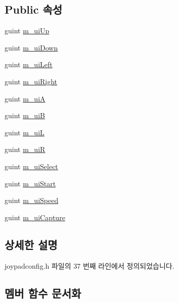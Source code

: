 \subsection*{Public 속성}
\begin{DoxyCompactItemize}
\item 
guint \mbox{\hyperlink{class_v_b_a_1_1_joypad_config_a9cd889f0d74de1737b32e81b21a0f78d}{m\+\_\+ui\+Up}}
\item 
guint \mbox{\hyperlink{class_v_b_a_1_1_joypad_config_a9c414798f77a069295c251e9d8805452}{m\+\_\+ui\+Down}}
\item 
guint \mbox{\hyperlink{class_v_b_a_1_1_joypad_config_af93165db21cb58f3b6df8f315d2471b5}{m\+\_\+ui\+Left}}
\item 
guint \mbox{\hyperlink{class_v_b_a_1_1_joypad_config_abc942773203f5ece2be3e4cb177d543f}{m\+\_\+ui\+Right}}
\item 
guint \mbox{\hyperlink{class_v_b_a_1_1_joypad_config_afd5a199c5dccb3d838f181a620b1fd33}{m\+\_\+uiA}}
\item 
guint \mbox{\hyperlink{class_v_b_a_1_1_joypad_config_a08925fb801c679365dc7209cd68f9039}{m\+\_\+uiB}}
\item 
guint \mbox{\hyperlink{class_v_b_a_1_1_joypad_config_a381cc261054c37379e3e558af75f2ade}{m\+\_\+uiL}}
\item 
guint \mbox{\hyperlink{class_v_b_a_1_1_joypad_config_ae78aa1e4661abe1501ae6d1dbc55db25}{m\+\_\+uiR}}
\item 
guint \mbox{\hyperlink{class_v_b_a_1_1_joypad_config_aed4863e16a6c6690449c953190954cd4}{m\+\_\+ui\+Select}}
\item 
guint \mbox{\hyperlink{class_v_b_a_1_1_joypad_config_a67e697cb5ca51bc15837385ea6fdf2b3}{m\+\_\+ui\+Start}}
\item 
guint \mbox{\hyperlink{class_v_b_a_1_1_joypad_config_acb2ec2357b18f2e259097b8827f37e3e}{m\+\_\+ui\+Speed}}
\item 
guint \mbox{\hyperlink{class_v_b_a_1_1_joypad_config_a2322b0a1550314bab86db0231d260459}{m\+\_\+ui\+Capture}}
\end{DoxyCompactItemize}


\subsection{상세한 설명}


joypadconfig.\+h 파일의 37 번째 라인에서 정의되었습니다.



\subsection{멤버 함수 문서화}
\mbox{\label{class_v_b_a_1_1_joypad_config_a27d56b77293ce938b1a6437a384d625d}} 
